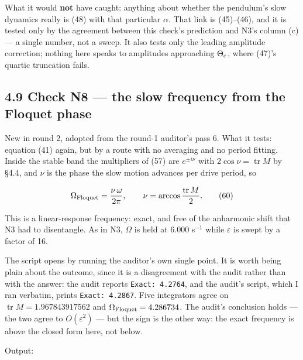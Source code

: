 \documentclass[11pt,a4paper]{article}
\newcommand{\tagmark}[1]{\marginnote{\scriptsize\ttfamily #1}}
\newcommand{\Ntag}{\tagmark{[N]}}   %
\providecommand{\passthrough}[1]{#1}
\begin{document}
What it would \textbf{not} have caught: anything about whether the pendulum's slow
dynamics really is (48) with that particular \(\alpha\). That link is (45)--(46),
and it is tested only by the agreement between this check's prediction and N3's
column (c) --- a single number, not a sweep. It also tests only the leading
amplitude correction; nothing here speaks to amplitudes approaching
\(\Theta_{\rm c}\), where (47)'s quartic truncation fails.

\hypertarget{check-n8-the-slow-frequency-from-the-floquet-phase}{%
\subsection{4.9 Check N8 --- the slow frequency from the Floquet phase}\label{check-n8-the-slow-frequency-from-the-floquet-phase}}

\Ntag{} New in round 2, adopted from the round-1 auditor's pass 6. What it tests:
equation (41) again, but by a route with no averaging and no period fitting.
Inside the stable band the multipliers of (57) are \(e^{\pm i\nu}\) with
\(2\cos\nu=\operatorname{tr}M\) by §4.4, and \(\nu\) is the phase the slow motion
advances per drive period, so

\begin{equation}
\Omega_{\rm Floquet} = \frac{\nu\,\omega}{2\pi},
  \qquad \nu = \arccos\frac{\operatorname{tr}M}{2}. \tag{60}
\end{equation}

This is a linear-response frequency: exact, and free of the anharmonic shift
that N3 had to disentangle. As in N3, \(\Omega\) is held at 6.000 s\(^{-1}\) while
\(\varepsilon\) is swept by a factor of 16.

The script opens by running the auditor's own single point. It is worth being
plain about the outcome, since it is a disagreement with the audit rather than
with the answer: the audit reports \passthrough{\lstinline!Exact: 4.2764!}, and the audit's script,
which I ran verbatim, prints \passthrough{\lstinline!Exact: 4.2867!}. Five integrators agree on
\(\operatorname{tr}M=1.967843917562\) and \(\Omega_{\rm Floquet}=4.286734\). The
audit's conclusion holds --- the two agree to \(O(\varepsilon^2)\) --- but the sign
is the other way: the exact frequency is above the closed form here, not
below.

Output:
\end{document}
